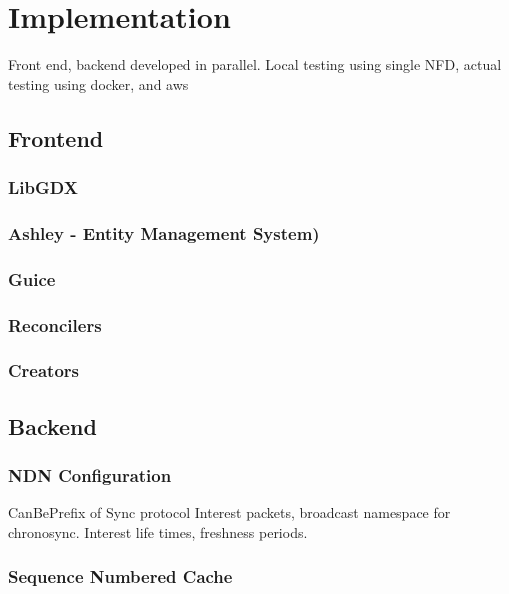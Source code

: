 \chapter{Implementation}
Front end, backend developed in parallel. Local testing using single NFD, actual testing using docker, and aws

\section{Frontend}


\subsection{LibGDX}


\subsection{Ashley - Entity Management System)}


\subsection{Guice}


\subsection{Reconcilers}


\subsection{Creators}




\section{Backend}

\subsection{NDN Configuration}
CanBePrefix of Sync protocol Interest packets, broadcast namespace for chronosync. Interest life times, freshness periods.

\subsection{Sequence Numbered Cache}


